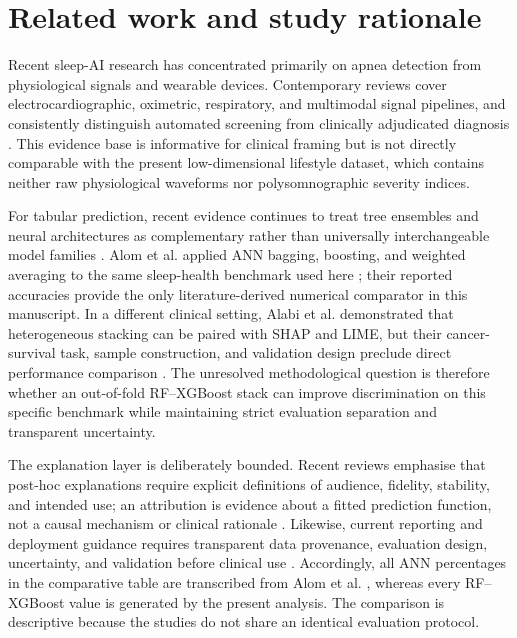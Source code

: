 ﻿\documentclass[preprint,12pt]{elsarticle}
\begin{document}
\section{Related work and study rationale}
Recent sleep-AI research has concentrated primarily on apnea detection from physiological signals and wearable devices. Contemporary reviews cover electrocardiographic, oximetric, respiratory, and multimodal signal pipelines, and consistently distinguish automated screening from clinically adjudicated diagnosis \cite{bazoukis2023,tyagi2023,abdalrazaq2024,giorgi2025}. This evidence base is informative for clinical framing but is not directly comparable with the present low-dimensional lifestyle dataset, which contains neither raw physiological waveforms nor polysomnographic severity indices.

For tabular prediction, recent evidence continues to treat tree ensembles and neural architectures as complementary rather than universally interchangeable model families \cite{borisov2024}. Alom et al. applied ANN bagging, boosting, and weighted averaging to the same sleep-health benchmark used here \cite{alom2024}; their reported accuracies provide the only literature-derived numerical comparator in this manuscript. In a different clinical setting, Alabi et al. demonstrated that heterogeneous stacking can be paired with SHAP and LIME, but their cancer-survival task, sample construction, and validation design preclude direct performance comparison \cite{alabi2023}. The unresolved methodological question is therefore whether an out-of-fold RF--XGBoost stack can improve discrimination on this specific benchmark while maintaining strict evaluation separation and transparent uncertainty.

The explanation layer is deliberately bounded. Recent reviews emphasise that post-hoc explanations require explicit definitions of audience, fidelity, stability, and intended use; an attribution is evidence about a fitted prediction function, not a causal mechanism or clinical rationale \cite{jung2023,allen2024}. Likewise, current reporting and deployment guidance requires transparent data provenance, evaluation design, uncertainty, and validation before clinical use \cite{tripodai2024,futureai2025}. Accordingly, all ANN percentages in the comparative table are transcribed from Alom et al. \cite{alom2024}, whereas every RF--XGBoost value is generated by the present analysis. The comparison is descriptive because the studies do not share an identical evaluation protocol.
\end{document}
